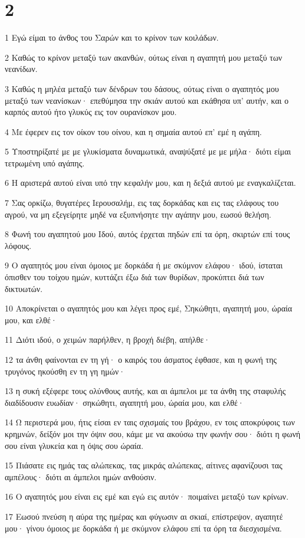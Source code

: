 \chapter{2}

\par 1 Εγώ είμαι το άνθος του Σαρών και το κρίνον των κοιλάδων.
\par 2 Καθώς το κρίνον μεταξύ των ακανθών, ούτως είναι η αγαπητή μου μεταξύ των νεανίδων.
\par 3 Καθώς η μηλέα μεταξύ των δένδρων του δάσους, ούτως είναι ο αγαπητός μου μεταξύ των νεανίσκων· επεθύμησα την σκιάν αυτού και εκάθησα υπ' αυτήν, και ο καρπός αυτού ήτο γλυκύς εις τον ουρανίσκον μου.
\par 4 Με έφερεν εις τον οίκον του οίνου, και η σημαία αυτού επ' εμέ η αγάπη.
\par 5 Υποστηρίξατέ με με γλυκίσματα δυναμωτικά, αναψύξατέ με με μήλα· διότι είμαι τετρωμένη υπό αγάπης.
\par 6 Η αριστερά αυτού είναι υπό την κεφαλήν μου, και η δεξιά αυτού με εναγκαλίζεται.
\par 7 Σας ορκίζω, θυγατέρες Ιερουσαλήμ, εις τας δορκάδας και εις τας ελάφους του αγρού, να μη εξεγείρητε μηδέ να εξυπνήσητε την αγάπην μου, εωσού θελήση.
\par 8 Φωνή του αγαπητού μου Ιδού, αυτός έρχεται πηδών επί τα όρη, σκιρτών επί τους λόφους.
\par 9 Ο αγαπητός μου είναι όμοιος με δορκάδα ή με σκύμνον ελάφου· ιδού, ίσταται όπισθεν του τοίχου ημών, κυττάζει έξω διά των θυρίδων, προκύπτει διά των δικτυωτών.
\par 10 Αποκρίνεται ο αγαπητός μου και λέγει προς εμέ, Σηκώθητι, αγαπητή μου, ώραία μου, και ελθέ·
\par 11 Διότι ιδού, ο χειμών παρήλθεν, η βροχή διέβη, απήλθε·
\par 12 τα άνθη φαίνονται εν τη γή· ο καιρός του άσματος έφθασε, και η φωνή της τρυγόνος ηκούσθη εν τη γη ημών·
\par 13 η συκή εξέφερε τους ολύνθους αυτής, και αι άμπελοι με τα άνθη της σταφυλής διαδίδουσιν ευωδίαν· σηκώθητι, αγαπητή μου, ώραία μου, και ελθέ·
\par 14 Ω περιστερά μου, ήτις είσαι εν ταις σχισμαίς του βράχου, εν τοις αποκρύφοις των κρημνών, δείξόν μοι την όψιν σου, κάμε με να ακούσω την φωνήν σου· διότι η φωνή σου είναι γλυκεία και η όψις σου ώραία.
\par 15 Πιάσατε εις ημάς τας αλώπεκας, τας μικράς αλώπεκας, αίτινες αφανίζουσι τας αμπέλους· διότι αι άμπελοι ημών ανθούσιν.
\par 16 Ο αγαπητός μου είναι εις εμέ και εγώ εις αυτόν· ποιμαίνει μεταξύ των κρίνων.
\par 17 Εωσού πνεύση η αύρα της ημέρας και φύγωσιν αι σκιαί, επίστρεψον, αγαπητέ μου· γίνου όμοιος με δορκάδα ή με σκύμνον ελάφου επί τα όρη τα διεσχισμένα.

